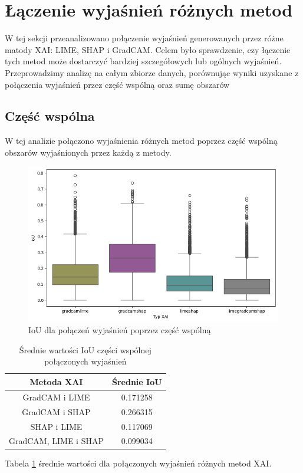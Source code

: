 \section*{Łączenie wyjaśnień różnych metod}
W tej sekcji przeanalizowano połączenie wyjaśnień generowanych przez różne matody XAI: LIME, SHAP i GradCAM.
Celem było sprawdzenie, czy łączenie tych metod może dostarczyć bardziej szczegółowych lub ogólnych wyjaśnień.
Przeprowadzimy analizę na całym zbiorze danych, porównując wyniki uzyskane z połączenia wyjaśnień przez część wspólną oraz sumę obszarów

\subsection*{Część wspólna}
W tej analizie połączono wyjaśnienia różnych metod poprzez część wspólną obszarów wyjaśnionych przez każdą z metody.

\begin{figure}[h]
	\centering\includegraphics[width=.9\textwidth]{img/combine_iou_and}
	\caption{IoU dla połączeń wyjaśnień poprzez część wspólną}  \label{rys:combine_iou_and}
\end{figure}
\begin{table}[h]
	\centering
	\begin{tabular}{|c|c|}
		\hline
		\textbf{Metoda XAI}  & Średnie IoU \\
		\hline
		GradCAM i LIME       & 0.171258    \\
		\hline
		GradCAM i SHAP       & 0.266315    \\
		\hline
		SHAP i LIME          & 0.117069    \\
		\hline
		GradCAM, LIME i SHAP & 0.099034    \\
		\hline
	\end{tabular}
	\caption{Średnie wartości IoU części wspólnej połączonych wyjaśnień}
	\label{tab:combineandiouand}
\end{table}
Tabela \ref{tab:combineandiouand} średnie wartości dla połączonych wyjaśnień różnych metod XAI.

